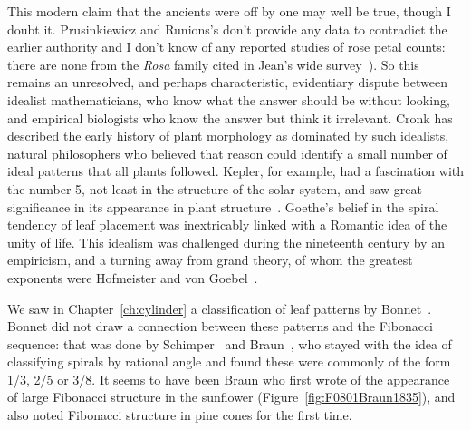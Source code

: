   This modern claim that the ancients were off by one may well be true, though I doubt it.  Prusinkiewicz and Runions's don't provide any data to contradict the earlier authority and I don't know of any reported studies of rose petal counts: there are none from the \emph{Rosa} family cited in Jean's wide survey~\cite{jeanPhyllotaxisSystemicStudy1994}). So this remains an unresolved, and perhaps characteristic, evidentiary dispute between idealist mathematicians, who know what the answer should be without looking, and empirical biologists who know the answer but think it irrelevant. 
  Cronk has described the early history of plant morphology as dominated by such idealists, natural philosophers who believed that reason could identify a small number of ideal patterns that all plants followed. Kepler, for example, had a fascination with the number 5, not least in the structure of the solar system,  and saw great significance in its appearance in plant structure~\cite{keplerSixCorneredSnowflake16112014}. Goethe's belief in the spiral tendency of leaf placement was inextricably linked with a Romantic idea of the unity of life. This idealism was challenged during the nineteenth century by an empiricism, and a turning away from grand theory,  of whom the greatest exponents were Hofmeister and von Goebel~\autocite{cronkMolecularOrganographyPlants2009}.
  
  
  We saw in Chapter~\ref{ch:cylinder} a classification of leaf patterns by Bonnet~\autocite{bonnetRecherchesUsageFeuilles1754}. Bonnet did not draw a connection between these patterns and the Fibonacci sequence: that was done by Schimper~\cite{schimperBeschreibungSymphytumZeyheri1835} and Braun~\cites{braunDrCarlSchimper1835, braunVergleichendeUntersuchungUber1831}, who stayed with the idea of classifying spirals by rational angle and found these were commonly of the form 1/3, 2/5 or 3/8. It seems to have been Braun who first wrote of the appearance of large Fibonacci structure in the sunflower (Figure~\ref{fig:F0801Braun1835}), and also noted Fibonacci structure in pine cones for the first time. 
  
